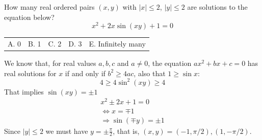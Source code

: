 \documentclass[12pt]{article}
\makeatletter
\newcounter{problem}
\newcommand{\multChoice}[5]{%
{\centering
\begin{tabular}{l @{\hskip 1.5cm} l @{\hskip 1.5cm} l @{\hskip 1.5cm} l @{\hskip 1.5cm} l}%
    A. #1 & B. #2 & C. #3 & D. #4 & E. #5
\end{tabular} \par}
}
\makeatother
\begin{document}
\begin{problem}
   How many real ordered pairs $(x,y)$ with $|x| \leq 2$, $|y| \leq 2$ are solutions to the equation below?
   $$x^2 + 2x\sin(xy) + 1 = 0$$
\end{problem}
\multChoice{0}{1}{2}{3}{Infinitely many}

\begin{solution}[C]
   We know that, for real values $a,b,c$ and $a \neq 0$, the equation $ax^2+bx+c=0$ has real solutions for $x$ if and only if $b^2 \geq 4ac$, also that $1 \geq \sin x$:
    $$ 4 \geq 4\sin^2(xy) \geq 4$$
    That implies $\sin(xy)= \pm 1$ \\
    \begin{align*}
        x^2\pm2x+1=0 \\
        \iff x=\mp 1 \\
        \Rightarrow \sin(\mp y) = \pm1
    \end{align*}
    Since $|y| \leq 2$ we must have $y=\pm \frac{\pi}{2}$, that is, $(x,y)= (-1,\pi /2) , (1, -\pi/2)$.
\end{solution}
\end{document}

